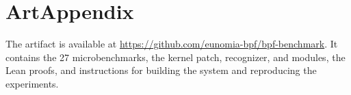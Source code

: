 \appendix
\section{ArtAppendix}
The artifact is available at \url{https://github.com/eunomia-bpf/bpf-benchmark}.
It contains the 27 microbenchmarks, the \tool kernel patch, recognizer, and \lang modules, the Lean proofs, and instructions for building the system and reproducing the experiments.
